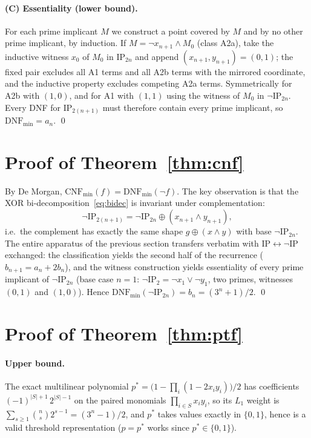 \documentclass[11pt]{article}
\newcommand{\IP}{\mathrm{IP}}
\newcommand{\DNFmin}{\mathrm{DNF}_{\min}}
\newcommand{\CNFmin}{\mathrm{CNF}_{\min}}
\begin{document}
\paragraph{(C) Essentiality (lower bound).}
For each prime implicant $M$ we construct a point covered by $M$ and
by no other prime implicant, by induction. If
$M = \lnot x_{n+1} \wedge M_0$ (class A2a), take the inductive witness
$x_0$ of $M_0$ in $\IP_{2n}$ and append
$(x_{n+1}, y_{n+1}) = (0, 1)$; the fixed pair excludes all A1 terms
and all A2b terms with the mirrored coordinate, and the inductive
property excludes competing A2a terms. Symmetrically for A2b with
$(1, 0)$, and for A1 with $(1, 1)$ using the witness of $M_0$ in
$\lnot\IP_{2n}$. Every DNF for $\IP_{2(n+1)}$ must therefore contain
every prime implicant, so $\DNFmin = a_n$. \qed

\section{Proof of Theorem~\ref{thm:cnf}}

By De Morgan, $\CNFmin(f) = \DNFmin(\lnot f)$. The key observation is
that the XOR bi-decomposition~\eqref{eq:bidec} is invariant under
complementation:
\[
\lnot\IP_{2(n+1)} = \lnot\IP_{2n} \oplus (x_{n+1} \wedge y_{n+1}),
\]
i.e.\ the complement has exactly the same shape
$g \oplus (x \wedge y)$ with base $\lnot\IP_{2n}$. The entire
apparatus of the previous section transfers verbatim with
$\IP \leftrightarrow \lnot\IP$ exchanged: the classification yields
the second half of the recurrence ($b_{n+1} = a_n + 2b_n$), and the
witness construction yields essentiality of every prime implicant of
$\lnot\IP_{2n}$ (base case $n = 1$:
$\lnot\IP_2 = \lnot x_1 \vee \lnot y_1$, two primes, witnesses
$(0,1)$ and $(1,0)$). Hence
$\DNFmin(\lnot\IP_{2n}) = b_n = (3^n+1)/2$. \qed

\section{Proof of Theorem~\ref{thm:ptf}}

\paragraph{Upper bound.}
The exact multilinear polynomial
$p^{*} = \bigl(1 - \prod_i (1 - 2 x_i y_i)\bigr)/2$ has coefficients
$(-1)^{\lvert S\rvert + 1}\, 2^{\lvert S\rvert - 1}$ on the paired
monomials $\prod_{i \in S} x_i y_i$, so its $L_1$ weight is
$\sum_{s \ge 1} \binom{n}{s} 2^{s-1} = (3^n-1)/2$, and $p^{*}$ takes
values exactly in $\{0, 1\}$, hence is a valid threshold
representation ($p = p^{*}$ works since $p^{*} \in \{0,1\}$).
\end{document}
